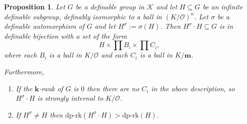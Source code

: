 \documentclass[11pt]{amsart}
\newtheorem{proposition}[theorem]{Proposition}
\theoremstyle{definition}
\newcommand{\m}{\textbf{m}}
\newcommand{\bk}{\textbf{k}}
\newcommand{\CK}{{\mathcal K}}
\newcommand{\CO}{{\mathcal O}}
\newcommand{\0}{\emptyset}
\def\dpr{\mathrm{dp\text{-}rk}}
\begin{document}
\begin{proposition} \label{a K/O result}
    Let $G$ be a definable group in $\CK$ and let $H\subseteq G$ be an infinite definable subgroup, definably isomorphic to a ball in $(K/\CO)^n$. Let $\sigma$ be a  definable automorphism of $G$
    and let $H^\sigma:=\sigma(H)$. Then $H^\sigma\cdot H\subseteq G$ is in definable bijection with a set of the form
    \[H\times \prod B_i\times \prod C_i,\]
    where each $B_i$ is a ball in $K/\CO$ and each $C_i$ is a  ball in $K/\m$.
    
    Furthermore,
    \begin{enumerate}
        \item If the $\bk$-rank of $G$ is $0$  then there are no $C_i$ in the above description, so $H^\sigma\cdot H$ is strongly internal to $K/\CO$.
        \item If $H^\sigma\neq H$ then $\dpr(H^\sigma\cdot H)>\dpr(H)$.
    \end{enumerate}
\end{proposition}
\end{document}
